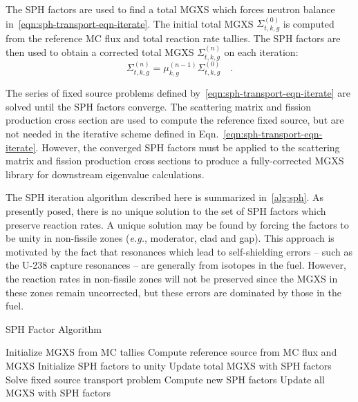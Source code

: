 The SPH factors are used to find a total MGXS which forces neutron balance in~\autoref{eqn:sph-transport-eqn-iterate}. The initial total MGXS $\Sigma_{t,k,g}^{(0)}$ is computed from the reference MC flux and total reaction rate tallies. The SPH factors are then used to obtain a corrected total MGXS $\Sigma_{t,k,g}^{(n)}$ on each iteration:
%
\begin{dmath}
\label{eqn:sph-update-sigt}
\Sigma_{t,k,g}^{(n)} = \mu_{k,g}^{(n-1)}\Sigma_{t,k,g}^{(0)} \quad .
\end{dmath}

The series of fixed source problems defined by~\autoref{eqn:sph-transport-eqn-iterate} are solved until the SPH factors converge. The scattering matrix and fission production cross section are used to compute the reference fixed source, but are not needed in the iterative scheme defined in Eqn.~\ref{eqn:sph-transport-eqn-iterate}. However, the converged SPH factors must be applied to the scattering matrix and fission production cross sections to produce a fully-corrected MGXS library for downstream eigenvalue calculations.

The SPH iteration algorithm described here is summarized in~\autoref{alg:sph}. As presently posed, there is no unique solution to the set of SPH factors which preserve reaction rates. A unique solution may be found by forcing the factors to be unity in non-fissile zones (\textit{e.g.}, moderator, clad and gap). This approach is motivated by the fact that resonances which lead to self-shielding errors -- such as the U-238 capture resonances -- are generally from isotopes in the fuel. However, the reaction rates in non-fissile zones will not be preserved since the MGXS in these zones remain uncorrected, but these errors are dominated by those in the fuel.

\begin{algorithm}[h]
\caption{SPH Factor Algorithm}
\label{alg:sph}
\begin{algorithmic}[1]
  \State Initialize MGXS from MC tallies
  \State Compute reference source from MC flux and MGXS
  \State Initialize SPH factors to unity
    \State Update total MGXS with SPH factors
    \State Solve fixed source transport problem\footnotemark
    \State Compute new SPH factors
  \EndWhile
  \State Update all MGXS with SPH factors
\end{algorithmic}
\end{algorithm}



